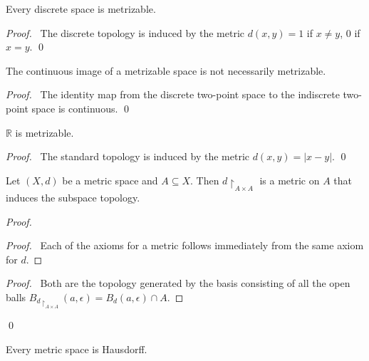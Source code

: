 \begin{lm}
  Every discrete space is metrizable.
\end{lm}

\begin{proof}
  \pf\ The discrete topology is induced by the metric $d(x, y) = 1$ if $x
  \neq
  y$, 0 if $x = y$. \qed
\end{proof}

\begin{prop}
  The continuous image of a metrizable space is not necessarily metrizable.
\end{prop}

\begin{proof}
  \pf\ The identity map from the discrete two-point space to the indiscrete two-point space is continuous. \qed
\end{proof}

\begin{lm}
  $\mathbb{R}$ is metrizable.
\end{lm}

\begin{proof}
  \pf\ The standard topology is induced by the metric $d(x, y) = |x-y|$. \qed
\end{proof}

\begin{lm}
  \label{lm:topology:metric:subspace}
  Let $(X, d)$ be a metric space and $A \subseteq X$. Then $d \restriction_{A
  \times A}$ is a metric on $A$ that induces the subspace topology.
\end{lm}

\begin{proof}
  \pf
  \begin{proof}
    \pf\ Each of the axioms for a metric follows immediately from the same
    axiom for $d$.
  \end{proof}
  \begin{proof}
    \pf\ Both are the topology generated by the basis consisting of all
    the open balls $B_{d \restriction_{A \times A}}(a, \epsilon) = B_d(a,
    \epsilon)  \cap      A$.
  \end{proof}
  \qed
\end{proof}

\begin{lm}
  \label{lm:topology:metric:Hausdorff}
  Every metric space is Hausdorff.
\end{lm}

